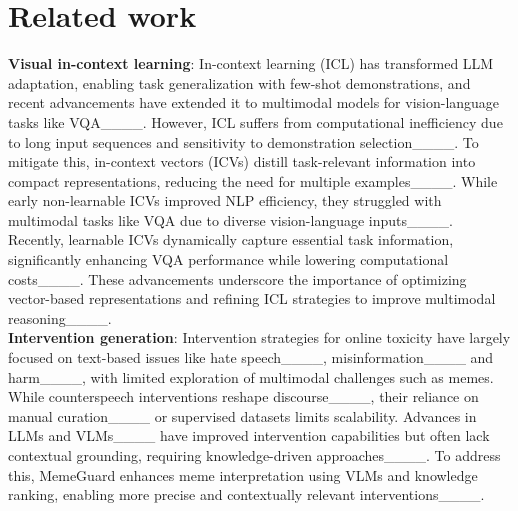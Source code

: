 \section{Related work}
\noindent\textbf{Visual in-context learning}: In-context learning (ICL) has transformed LLM adaptation, enabling task generalization with few-shot demonstrations, and recent advancements have extended it to multimodal models for vision-language tasks like VQA____. However, ICL suffers from computational inefficiency due to long input sequences and sensitivity to demonstration selection____. To mitigate this, in-context vectors (ICVs) distill task-relevant information into compact representations, reducing the need for multiple examples____. While early non-learnable ICVs improved NLP efficiency, they struggled with multimodal tasks like VQA due to diverse vision-language inputs____. Recently, learnable ICVs dynamically capture essential task information, significantly enhancing VQA performance while lowering computational costs____. These advancements underscore the importance of optimizing vector-based representations and refining ICL strategies to improve multimodal reasoning____.\\
\textbf{Intervention generation}: Intervention strategies for online toxicity have largely focused on text-based issues like hate speech____, misinformation____ and harm____, with limited exploration of multimodal challenges such as memes. While counterspeech interventions reshape discourse____, their reliance on manual curation____ or supervised datasets limits scalability. Advances in LLMs and VLMs____ have improved intervention capabilities but often lack contextual grounding, requiring knowledge-driven approaches____. To address this, MemeGuard enhances meme interpretation using VLMs and knowledge ranking, enabling more precise and contextually relevant interventions____.
